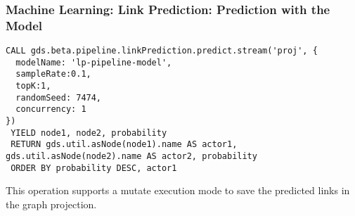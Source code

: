 \begin{frame}[fragile]\frametitle{Machine Learning: Link Prediction: Prediction with the Model}

\begin{lstlisting}
CALL gds.beta.pipeline.linkPrediction.predict.stream('proj', {
  modelName: 'lp-pipeline-model',
  sampleRate:0.1,
  topK:1,
  randomSeed: 7474,
  concurrency: 1
})
 YIELD node1, node2, probability
 RETURN gds.util.asNode(node1).name AS actor1, gds.util.asNode(node2).name AS actor2, probability
 ORDER BY probability DESC, actor1
\end{lstlisting}

This operation supports a mutate execution mode to save the predicted links in the graph projection.

\end{frame}